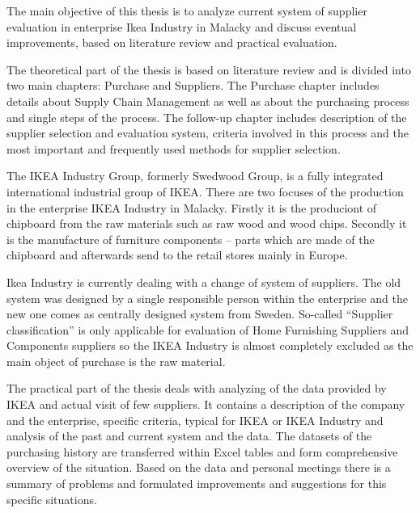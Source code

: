 \documentclass[oneside,12pt]{article}%
\begin{document}
The main objective of this thesis is to analyze current system of supplier evaluation in enterprise Ikea Industry in Malacky and discuss eventual improvements, based on literature review and practical evaluation.\par
The theoretical part of the thesis is based on literature review and is divided into two main chapters: Purchase and Suppliers. The Purchase chapter includes details about Supply Chain Management as well as about the purchasing process and single steps of the process. The follow-up chapter includes description of the supplier selection and evaluation system, criteria involved in this process and the most important and frequently used methods for supplier selection.\par
The IKEA Industry Group, formerly Swedwood Group, is a fully integrated international industrial group of IKEA. There are two focuses of the production in the enterprise IKEA Industry in Malacky. Firstly it is the produciont of chipboard from the raw materials such as raw wood and wood chips. Secondly it is the manufacture of furniture components – parts which are made of the chipboard and afterwards send to the retail stores mainly in Europe.\par
Ikea Industry is currently dealing with a change of system of suppliers. The old system was designed by a single responsible person within the enterprise and the new one comes as centrally designed system from Sweden. So-called ``Supplier classification'' is only applicable for evaluation of Home Furnishing Suppliers and Components suppliers so the IKEA Industry is almost completely excluded as the main object of purchase is the raw material.\par
The practical part of the thesis deals with analyzing of the data provided by IKEA and actual visit of few suppliers. It contains a description of the company and the enterprise, specific criteria, typical for IKEA or IKEA Industry and analysis of the past and current system and the data. The datasets of the purchasing history are transferred within Excel tables and form comprehensive overview of the situation. Based on the data and personal meetings there is a summary of problems and formulated improvements and suggestions for this specific situations.
\end{document}
